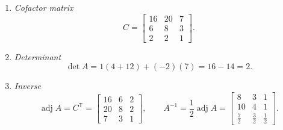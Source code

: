 \documentclass{report}
\begin{document}
{\begin{enumerate}[label=(\roman*)]
\item \emph{Cofactor matrix}
\[
C=\begin{bmatrix}
16 & 20 & 7\\
 6 &  8 & 3\\
 2 &  2 & 1
\end{bmatrix}.
\]

\item \emph{Determinant}
\[
\det A
  =1(4+12) +(-2)(7)        %
  =16-14
  =2.
\]

\item \emph{Inverse}
\[
\operatorname{adj}A=C^{\mathsf T}=
\begin{bmatrix}
16 &  6 & 2\\
20 &  8 & 2\\
 7 &  3 & 1
\end{bmatrix},\qquad
A^{-1}=\frac{1}{2}\operatorname{adj}A=
\begin{bmatrix}
 8 & 3 & 1\\
10 & 4 & 1\\
\frac72 & \frac32 & \frac12
\end{bmatrix}.
\]
\end{enumerate}
}
\end{document}
